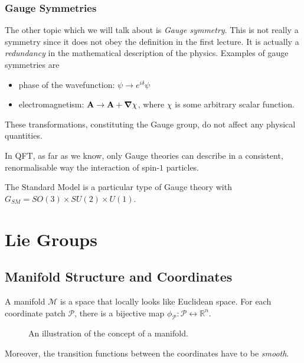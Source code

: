 \subsection*{Gauge Symmetries}%
\label{sub:gauge_symmetries}

The other topic which we will talk about is \emph{Gauge symmetry}. This is not really a symmetry since it does not obey the definition in the first lecture. It is actually a \emph{redundancy} in the mathematical description of the physics.
Examples of gauge symmetries are
\begin{itemize}
  \item phase of the wavefunction: $\psi \to e^{i\delta} \psi$
  \item electromagnetism: $\vb{A} \to \vb{A} + \grad \chi$, where $\chi$ is some arbitrary scalar function.
\end{itemize}
These transformations, constituting the Gauge group, do not affect any physical quantities.
\begin{leftbar}
  \begin{remark}
    In QFT, as far as we know, only Gauge theories can describe in a consistent, renormalisable way the interaction of spin-$1$ particles.
  \end{remark}
\end{leftbar}

The Standard Model is a particular type of Gauge theory with $G_{SM} = SO(3) \times SU(2) \times U(1)$.

\chapter{Lie Groups}%
\label{cha:lie_groups}

\section{Manifold Structure and Coordinates}%
\label{sec:definitions}

\begin{definition}[Manifold]
  A manifold $\mathcal{M}$ is a space that locally looks like Euclidean space. For each coordinate patch $\mathcal{P}$, there is a bijective map $\phi_\mathcal{P}: \mathcal{P} \leftrightarrow \mathbb{R}^n$. 
  \begin{figure}[htbp]
    \centering
    \def\svgwidth{0.6\columnwidth}
    
    \caption{An illustration of the concept of a manifold.}
    \label{fig:manifold}
  \end{figure}
  Moreover, the transition functions between the coordinates have to be \emph{smooth}.
\end{definition}

